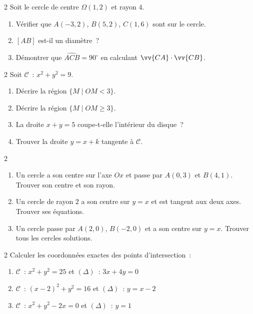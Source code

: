 \begin{exo}{2}
Soit le cercle de centre $\Omega(1,2)$ et rayon $4$.
\begin{enumerate}
  \item V\'erifier que $A(-3,2)$, $B(5,2)$, $C(1,6)$ sont sur le cercle.
  \item $[AB]$ est-il un diam\`etre~?
  \item D\'emontrer que $\widehat{ACB}=90^{\circ}$ en calculant $\vv{CA}\cdot\vv{CB}$.
\end{enumerate}
\end{exo}

\begin{exo}{2}
Soit $\mathcal{C}$~: $x^2+y^2=9$.
\begin{enumerate}
  \item D\'ecrire la r\'egion $\{M \mid OM < 3\}$.
  \item D\'ecrire la r\'egion $\{M \mid OM \geq 3\}$.
  \item La droite $x+y=5$ coupe-t-elle l'int\'erieur du disque~?
  \item Trouver la droite $y=x+k$ tangente \`a $\mathcal{C}$.
\end{enumerate}
\end{exo}

\begin{exo}{2}
\begin{enumerate}
  \item Un cercle a son centre sur l'axe $Ox$ et passe par $A(0,3)$
        et $B(4,1)$. Trouver son centre et son rayon.
  \item Un cercle de rayon $2$ a son centre sur $y=x$ et est tangent aux deux axes.
        Trouver ses \'equations.
  \item Un cercle passe par $A(2,0)$, $B(-2,0)$ et a son centre
        sur $y=x$. Trouver tous les cercles solutions.
\end{enumerate}
\end{exo}

\begin{exo}{2}
Calculer les coordonn\'ees exactes des points d'intersection~:
\begin{enumerate}
  \item $\mathcal{C}$~: $x^2+y^2=25$ et $(\Delta)$~: $3x+4y=0$
  \item $\mathcal{C}$~: $(x-2)^2+y^2=16$ et $(\Delta)$~: $y=x-2$
  \item $\mathcal{C}$~: $x^2+y^2-2x=0$ et $(\Delta)$~: $y=1$
\end{enumerate}
\end{exo}

